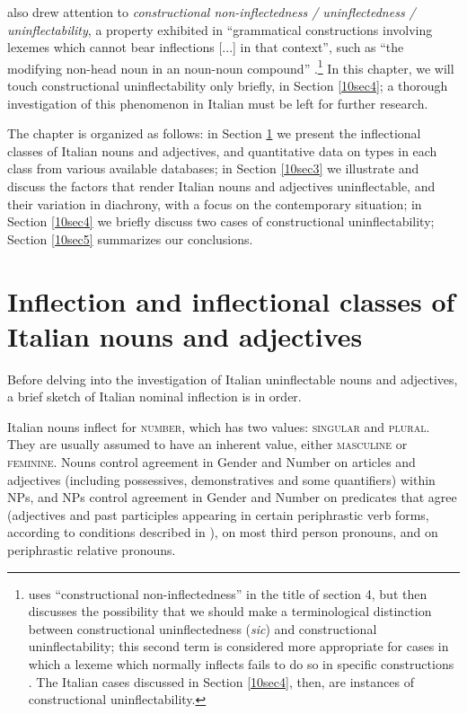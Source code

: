 \documentclass[output=paper,colorlinks,citecolor=brown]{langscibook}
\begin{document}
\citet{spencer2020} also drew attention to \emph{constructional non-inflectedness / uninflectedness / uninflectability}, a property exhibited in ``grammatical constructions involving lexemes which cannot bear inflections [...] in that context'', such as ``the modifying non-head noun in an  noun-noun compound'' \citep[148]{spencer2020}.\footnote{\citet{spencer2020} uses ``constructional non-inflectedness''	in the title of section 4, but then discusses the possibility that we should make a terminological distinction between constructional uninflectedness (\emph{sic}) and constructional uninflectability; this second term is considered more appropriate for cases in which a lexeme	which normally inflects fails to do so in specific constructions \citep[148--149]{spencer2020}. The Italian cases discussed in Section \ref{10sec4}, then, are instances of constructional uninflectability.} In this chapter, we will touch constructional uninflectability only briefly, in Section \ref{10sec4}; a thorough investigation of this phenomenon in Italian must be left for further research.

The chapter is organized as follows: in Section \ref{10sec2} we present the inflectional classes of Italian nouns and adjectives, and quantitative data on types in each class from various available databases; in Section \ref{10sec3} we illustrate and discuss the factors that render Italian nouns and adjectives uninflectable, and their variation in diachrony, with a focus on the contemporary situation; in Section \ref{10sec4} we briefly discuss two cases of constructional uninflectability; Section \ref{10sec5} summarizes our conclusions.

\section{Inflection and inflectional classes of Italian nouns and adjectives} \label{10sec2}

Before delving into the investigation of Italian uninflectable nouns and adjectives, a brief sketch of Italian nominal inflection is in order.

Italian nouns inflect for \textsc{number}, which has two values: \textsc{singular} and \textsc{plural}. They are usually assumed to have an inherent \textsc{} value, either \textsc{masculine} or \textsc{feminine}. Nouns control agreement in Gender and Number on articles and adjectives (including possessives, demonstratives and some quantifiers) within NPs, and NPs control agreement in Gender and Number on predicates that agree (adjectives and past participles appearing in certain periphrastic verb forms, according to conditions described in \citealt[78]{thornton2019-noncanonical}), on most third person pronouns, and on periphrastic relative pronouns.
\end{document}
